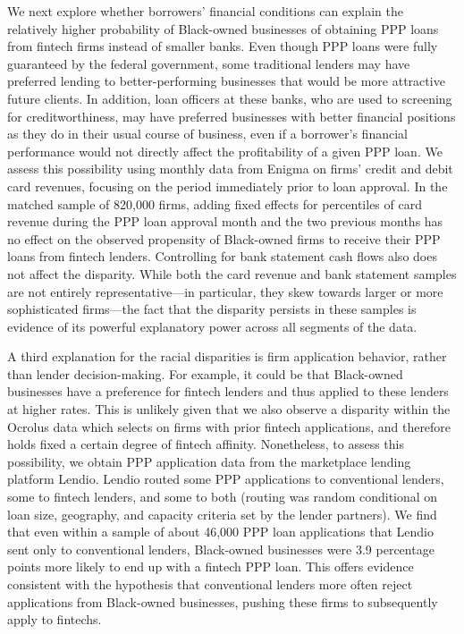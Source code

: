 \documentclass[11pt]{article}
\begin{document}
We next explore whether borrowers' financial conditions can explain the relatively higher probability of Black-owned businesses of obtaining PPP loans from fintech firms instead of smaller banks. Even though PPP loans were fully guaranteed by the federal government, some traditional lenders may have preferred lending to better-performing businesses that would be more attractive future clients. In addition, loan officers at these banks, who are used to screening for creditworthiness, may have preferred businesses with better financial positions as they do in their usual course of business, even if a borrower's financial performance would not directly affect the profitability of a given PPP loan. We assess this possibility using monthly data from Enigma on firms' credit and debit card revenues, focusing on the period immediately prior to loan approval. In the matched sample of 820,000 firms, adding fixed effects for percentiles of card revenue during the PPP loan approval month and the two previous months has no effect on the observed propensity of Black-owned firms to receive their PPP loans from fintech lenders. Controlling for bank statement cash flows also does not affect the disparity. While both the card revenue and bank statement samples are not entirely representative---in particular, they skew towards larger or more sophisticated firms---the fact that the disparity persists in these samples is evidence of its powerful explanatory power across all segments of the data.

A third explanation for the racial disparities is firm application behavior, rather than lender decision-making. For example, it could be that Black-owned businesses have a preference for fintech lenders and thus applied to these lenders at higher rates. This is unlikely given that we also observe a disparity within the Ocrolus data which selects on firms with prior fintech applications, and therefore holds fixed a certain degree of fintech affinity. Nonetheless, to assess this possibility, we obtain PPP application data from the marketplace lending platform Lendio. Lendio routed some PPP applications to conventional lenders, some to fintech lenders, and some to both (routing was random conditional on loan size, geography, and capacity criteria set by the lender partners). We find that even within a sample of about 46,000 PPP loan applications that Lendio sent only to conventional lenders, Black-owned businesses were 3.9 percentage points more likely to end up with a fintech PPP loan. This offers evidence consistent with the hypothesis that conventional lenders more often reject applications from Black-owned businesses, pushing these firms to subsequently apply to fintechs. 
\end{document}
